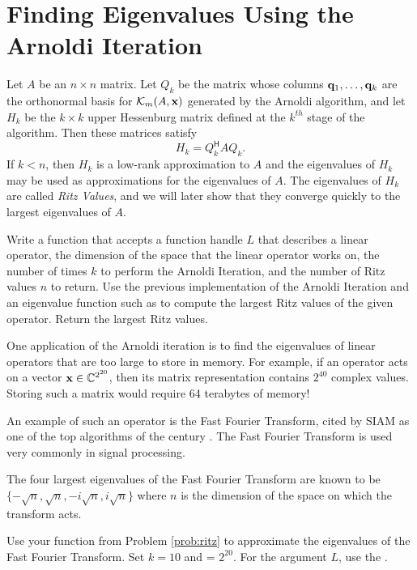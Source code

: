 \section*{Finding Eigenvalues Using the Arnoldi Iteration} %

Let $A$ be an $n \times n$ matrix.
Let $Q_k$ be the matrix whose columns $\mathbf{q}_1, \ldots, \mathbf{q}_k$ are the orthonormal basis for $\mathcal{K}_m(A, \mathbf{x})$ generated by the Arnoldi algorithm, and let $H_k$ be the $k\times k$ upper Hessenburg matrix defined at the $k^{th}$ stage of the algorithm.
Then these matrices satisfy
\begin{equation}\label{equ:HQA}
H_k = Q_k^{\mathsf H} A Q_k.
\end{equation}
If $k<n$, then $H_k$ is a low-rank approximation to $A$  and the eigenvalues of $H_k$ may be used as approximations for the eigenvalues of $A$.
The eigenvalues of $H_k$ are called \emph{Ritz Values}, and we will later show that they converge quickly to the largest eigenvalues of $A$.

\begin{problem}\label{prob:ritz}
Write a function that accepts a function handle $L$ that describes a linear operator, the dimension of the space  that the linear operator works on, the number of times $k$ to perform the Arnoldi Iteration, and the number of Ritz values $n$ to return.
Use the previous implementation of the Arnoldi Iteration and an eigenvalue function such as  to compute the largest Ritz values of the given operator.
Return the  largest Ritz values.
\end{problem}

One application of the Arnoldi iteration is to find the eigenvalues of linear operators that are too large to store in memory.
For example, if an operator acts on a vector $\mathbf{x} \in \mathbb{C}^{2^{20}}$, then its matrix representation contains $2^{40}$ complex values.
Storing such a matrix would require 64 terabytes of memory!

An example of such an operator is the Fast Fourier Transform, cited by SIAM as one of the top algorithms of the century \cite{cipra2000}.
The Fast Fourier Transform is used very commonly in signal processing.

\begin{problem}
\label{prob:fourier_eigs}
The four largest eigenvalues of the Fast Fourier Transform are known to be $\{ -\sqrt{n}, \sqrt{n}, -i\sqrt{n}, i\sqrt{n} \}$ where $n$ is the dimension of the space on which the transform acts.

Use your function from Problem \ref{prob:ritz} to approximate the eigenvalues of the Fast Fourier Transform.
Set $k = 10$ and  = $2^{20}$.
For the argument $L$, use the .
\end{problem}

